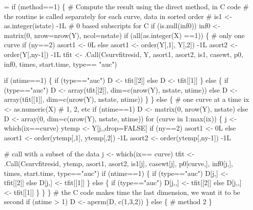 \documentclass{article}
\begin{document}
\begin{nwchunk}
=
 if (method==1) \{
     # Compute the result using the direct method, in C code
     # the routine is called separately for each curve, data in sorted order
     #
     is1 <- as.integer(istate) -1L  # 0 based subscripts for C
     if (is.null(inf0)) inf0 <- matrix(0, nrow=nrow(Y), ncol=nstate)
     if (all(as.integer(X) ==1)) \{ # only one curve
         if (ny==2) asort1 <- 0L else asort1 <- order(Y[,1], Y[,2]) -1L
         asort2 <- order(Y[,ny-1]) -1L
         tfit <- .Call(Csurvfitresid, Y, asort1, asort2, is1, 
                       casewt, p0, inf0, times, start.time, 
                       type== "auc")
 
         if (ntime==1) \{
             if (type=="auc") D <- tfit[[2]] else D <- tfit[[1]]
         \}
         else \{
             if (type=="auc") D <- array(tfit[[2]], dim=c(nrow(Y), nstate, ntime))
             else         D <- array(tfit[[1]], dim=c(nrow(Y), nstate, ntime))
         \}
     \}
     else \{ # one curve at a time
         ix <- as.numeric(X)  # 1, 2, etc
         if (ntime==1) D <- matrix(0, nrow(Y), nstate)
         else D <- array(0, dim=c(nrow(Y), nstate, ntime))
         for (curve in 1:max(ix)) \{
             j <- which(ix==curve)
             ytemp <- Y[j,,drop=FALSE]
             if (ny==2) asort1 <- 0L 
             else asort1 <- order(ytemp[,1], ytemp[,2]) -1L
             asort2 <- order(ytemp[,ny-1]) -1L
 
             # call with a subset of the data
             j <- which(ix== curve)
             tfit <- .Call(Csurvfitresid, ytemp, asort1, asort2, is1[j],
                           casewt[j], p0[curve,], inf0[j,], times, 
                           start.time, type=="auc")
             if (ntime==1) \{
                 if (type=="auc") D[j,] <- tfit[[2]] else D[j,] <- tfit[[1]]
             \} else \{
                 if (type=="auc") D[j,,] <- tfit[[2]] else D[j,,] <- tfit[[1]]
             \}
         \}
     \} 
     # the C code makes time the last dimension, we want it to be second
     if (ntime > 1) D <- aperm(D, c(1,3,2))
 \}
 else \{
     # method 2
 \}
\end{nwchunk}
\end{document}
